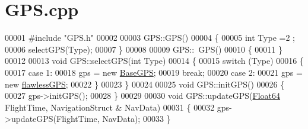 \hypertarget{_g_p_s_8cpp_source}{}\section{G\+P\+S.\+cpp}
\label{_g_p_s_8cpp_source}

\begin{DoxyCode}
00001 \textcolor{preprocessor}{#include "GPS.h"}
00002 
00003 GPS::GPS()
00004 \{
00005     \textcolor{keywordtype}{int} Type =2 ;
00006     selectGPS(Type);
00007 \}
00008 
00009 GPS::~GPS()
00010 \{
00011 \}
00012 
00013 \textcolor{keywordtype}{void} GPS::selectGPS(\textcolor{keywordtype}{int} Type)
00014 \{
00015     \textcolor{keywordflow}{switch} (Type)
00016     \{
00017     \textcolor{keywordflow}{case} 1:
00018         gps = \textcolor{keyword}{new} \hyperlink{class_base_g_p_s}{BaseGPS};
00019         \textcolor{keywordflow}{break};
00020     \textcolor{keywordflow}{case} 2:
00021         gps = \textcolor{keyword}{new} \hyperlink{classflawless_g_p_s}{flawlessGPS};
00022     \}
00023 \}
00024 
00025 \textcolor{keywordtype}{void} GPS::initGPS()
00026 \{
00027     gps->initGPS();
00028 \}
00029 
00030 \textcolor{keywordtype}{void} GPS::updateGPS(\hyperlink{group___tools_ga3f1431cb9f76da10f59246d1d743dc2c}{Float64} FlightTime, NavigationStruct & NavData)
00031 \{
00032     gps->updateGPS(FlightTime, NavData);
00033 \}
\end{DoxyCode}
